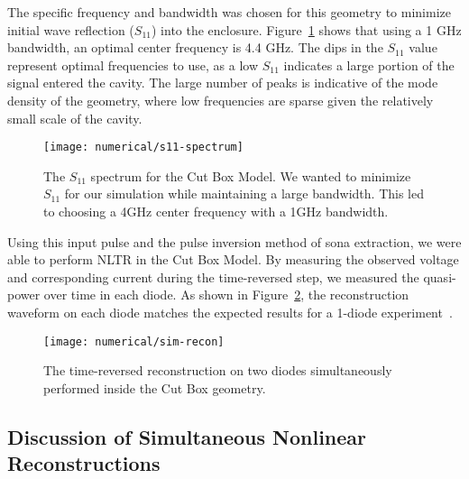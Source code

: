 The specific frequency and bandwidth was chosen for this geometry to minimize initial wave reflection ($S_{11}$) into the enclosure. Figure~\ref{fig:numerical-s11-spectrum} shows that using a 1 GHz bandwidth, an optimal center frequency is 4.4 GHz. The dips in the $S_{11}$ value represent optimal frequencies to use, as a low $S_{11}$ indicates a large portion of the signal entered the cavity. The large number of peaks is indicative of the mode density of the geometry, where low frequencies are sparse given the relatively small scale of the cavity.

\begin{figure}[t]
\centering
\texttt{[image: numerical/s11-spectrum]}
\caption[$S_{11}$ spectrum of the Cut Box Model]{The $S_{11}$ spectrum for the Cut Box Model. We wanted to minimize $S_{11}$ for our simulation while maintaining a large bandwidth. This led to choosing a 4GHz center frequency with a 1GHz bandwidth.}
\label{fig:numerical-s11-spectrum}
\end{figure}

Using this input pulse and the pulse inversion method of sona extraction, we were able to perform NLTR in the Cut Box Model. By measuring the observed voltage and corresponding current during the time-reversed step, we measured the quasi-power over time in each diode. As shown in Figure~\ref{fig:numerical-sim-recon}, the reconstruction waveform on each diode matches the expected results for a 1-diode experiment~\cite{taddese_sensing_2010,barbieri_time_2010}.
\begin{figure}[t]
\centering
\texttt{[image: numerical/sim-recon]}
\caption[Simultaneous reconstructions on two diodes]{The time-reversed reconstruction on two diodes simultaneously performed inside the Cut Box geometry.}
\label{fig:numerical-sim-recon}
\end{figure}

\subsection{Discussion of Simultaneous Nonlinear Reconstructions}

